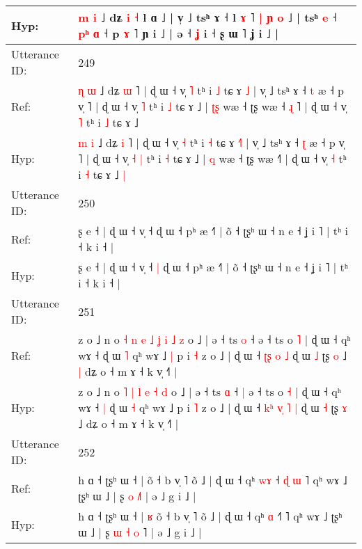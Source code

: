 \documentclass[10pt]{article}
\DeclareRobustCommand{\hl}[1]{{\textcolor{red}{#1}}}
\begin{document}
\begin{longtable}{ll}
 \\
Hyp: & \hl{m} \hl{i} ˩ dʑ \hl{i} \hl{˧} l ɑ ˩ | v̩ ˩ tsʰ ɤ ˧ l \hl{ɤ} ˥\hl{}\hl{} \hl{|} \hl{ɲ} \hl{}\hl{o} ˩ |\hl{}\hl{}\hl{}\hl{}\hl{} tsʰ \hl{e} ˧ \hl{p}\hl{ʰ} \hl{ɑ} ˧ p \hl{}\hl{ɤ} ˥\hl{}\hl{}\hl{}\hl{}\hl{}\hl{} ɲ i ˩ | ə ˧ \hl{ʝ} i ˧ ʂ ɯ ˥ ʝ i ˩ |
 \\
\midrule
Utterance ID: & 249 \\
Ref: & \hl{ɳ} \hl{ɯ} ˩ dʑ \hl{ɯ} ˥ | ɖ ɯ ˧ v̩ \hl{˥} tʰ i \hl{˩} tɕ ɤ \hl{}\hl{˩} | v̩ ˩ tsʰ ɤ ˧ \hl{t} æ ˧ p v̩ ˥ | ɖ ɯ ˧ v̩\hl{}\hl{} \hl{˥} tʰ i \hl{˩} tɕ ɤ ˩ | \hl{ʈ}\hl{ʂ} wæ ˧ ʈʂ wæ ˧\hl{ }\hl{ɻ}\hl{ }˥ | ɖ ɯ ˧ v̩ \hl{˥} tʰ i \hl{˩} tɕ ɤ ˩\hl{}\hl{}
 \\
Hyp: & \hl{m} \hl{i} ˩ dʑ \hl{i} ˥ | ɖ ɯ ˧ v̩ \hl{˧} tʰ i \hl{˧} tɕ ɤ \hl{˧}\hl{˥} | v̩ ˩ tsʰ ɤ ˧ \hl{ʈ} æ ˧ p v̩ ˥ | ɖ ɯ ˧ v̩\hl{ }\hl{˧} \hl{|} tʰ i \hl{˧} tɕ ɤ ˩ | \hl{}\hl{q} wæ ˧ ʈʂ wæ ˧\hl{}\hl{}\hl{}˥ | ɖ ɯ ˧ v̩ \hl{˧} tʰ i \hl{˧} tɕ ɤ ˩\hl{ }\hl{|}
 \\
\midrule
Utterance ID: & 250 \\
Ref: & ʂ e ˧ | ɖ ɯ ˧ v̩ ˧\hl{}\hl{} ɖ ɯ ˧ pʰ æ ˧˥ | õ ˧ ʈʂʰ ɯ ˧ n e ˧ ʝ i ˥ | tʰ i ˧ k i ˧ |
 \\
Hyp: & ʂ e ˧ | ɖ ɯ ˧ v̩ ˧\hl{ }\hl{|} ɖ ɯ ˧ pʰ æ ˧˥ | õ ˧ ʈʂʰ ɯ ˧ n e ˧ ʝ i ˥ | tʰ i ˧ k i ˧ |
 \\
\midrule
Utterance ID: & 251 \\
Ref: & z o ˩ n o\hl{ }\hl{˧}\hl{ }\hl{n} \hl{e} \hl{˩} \hl{ʝ} \hl{i} \hl{˩} \hl{z} o ˩ | ə ˧ ts \hl{o} ˧\hl{}\hl{} ə ˧ ts o \hl{˥} | ɖ ɯ ˧ qʰ wɤ ˧\hl{}\hl{} ɖ ɯ \hl{˥} qʰ wɤ ˩\hl{ }\hl{|} p i \hl{˧} z o ˩ | ɖ ɯ ˧\hl{}\hl{}\hl{} \hl{ʈ}\hl{ʂ} \hl{o} \hl{˩} ɖ ɯ \hl{˩} ʈʂ \hl{o} ˩\hl{ }\hl{|} dʑ o ˧ m ɤ ˧ k v̩ ˧˥ |
 \\
Hyp: & z o ˩ n o\hl{}\hl{}\hl{}\hl{} \hl{˥} \hl{|} \hl{l} \hl{e} \hl{˧} \hl{d} o ˩ | ə ˧ ts \hl{ɑ} ˧\hl{ }\hl{|} ə ˧ ts o \hl{˧} | ɖ ɯ ˧ qʰ wɤ ˧\hl{ }\hl{|} ɖ ɯ \hl{˧} qʰ wɤ ˩\hl{}\hl{} p i \hl{˥} z o ˩ | ɖ ɯ ˧\hl{ }\hl{k}\hl{ʰ} \hl{v}\hl{̩} \hl{˥} \hl{|} ɖ ɯ \hl{˧} ʈʂ \hl{ɤ} ˩\hl{}\hl{} dʑ o ˧ m ɤ ˧ k v̩ ˧˥ |
 \\
\midrule
Utterance ID: & 252 \\
Ref: & h ɑ ˧ ʈʂʰ ɯ ˧ |\hl{}\hl{} õ ˧ b v̩ ˥ õ ˩ | ɖ ɯ ˧ qʰ \hl{w}\hl{ɤ} ˧\hl{ }\hl{ɖ}\hl{ }\hl{ɯ} ˥ qʰ wɤ ˩ ʈʂʰ ɯ ˩ | ʂ\hl{}\hl{} \hl{o} \hl{}\hl{˩}˥ | ə ˩ g i ˩ |
 \\
Hyp: & h ɑ ˧ ʈʂʰ ɯ ˧ |\hl{ }\hl{ʁ} õ ˧ b v̩ ˥ õ ˩ | ɖ ɯ ˧ qʰ \hl{}\hl{ɑ} ˧\hl{}\hl{}\hl{}\hl{˥} ˥ qʰ wɤ ˩ ʈʂʰ ɯ ˩ | ʂ\hl{ }\hl{ɯ} \hl{˧} \hl{o}\hl{ }˥ | ə ˩ g i ˩ |

\end{longtable}
\end{document}
